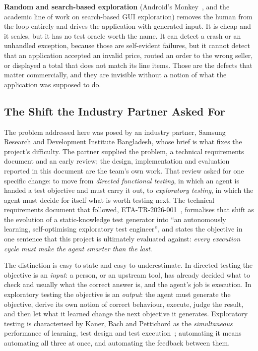 \textbf{Random and search-based exploration} (Android's Monkey~\cite{monkey},
and the academic line of work on search-based GUI exploration) removes the
human from the loop entirely and drives the application with generated input.
It is cheap and it scales, but it has no test oracle worth the name. It can
detect a crash or an unhandled exception, because those are self-evident
failures, but it cannot detect that an application accepted an invalid price,
routed an order to the wrong seller, or displayed a total that does not match
its line items. Those are the defects that matter commercially, and they are
invisible without a notion of what the application was supposed to do.

\subsection{The Shift the Industry Partner Asked For}
\label{subsec:shift}

The problem addressed here was posed by an industry partner, Samsung Research
and Development Institute Bangladesh, whose brief is what fixes the project's
difficulty. The partner supplied the problem, a technical requirements document
and an early review; the design, implementation and evaluation reported in this
document are the team's own work. That review asked for one specific change: to
move from \emph{directed functional testing}, in which an agent is handed a
test objective and must carry it out, to \emph{exploratory testing}, in which
the agent must decide for itself what is worth testing next. The technical
requirements document that followed, ETA-TR-2026-001~\cite{etatr}, formalises
that shift as the evolution of a static-knowledge test generator into ``an
autonomously learning, self-optimising exploratory test engineer'', and states
the objective in one sentence that this project is ultimately evaluated
against: \emph{every execution cycle must make the agent smarter than the
last}.

The distinction is easy to state and easy to underestimate. In directed testing
the objective is an \emph{input}: a person, or an upstream tool, has already
decided what to check and usually what the correct answer is, and the agent's
job is execution. In exploratory testing the objective is an \emph{output}: the
agent must generate the objective, derive its own notion of correct behaviour,
execute, judge the result, and then let what it learned change the next
objective it generates. Exploratory testing is characterised by Kaner, Bach and
Pettichord as the \emph{simultaneous} performance of learning, test design and
test execution~\cite{kaner}; automating it means automating all three at once,
and automating the feedback between them.

